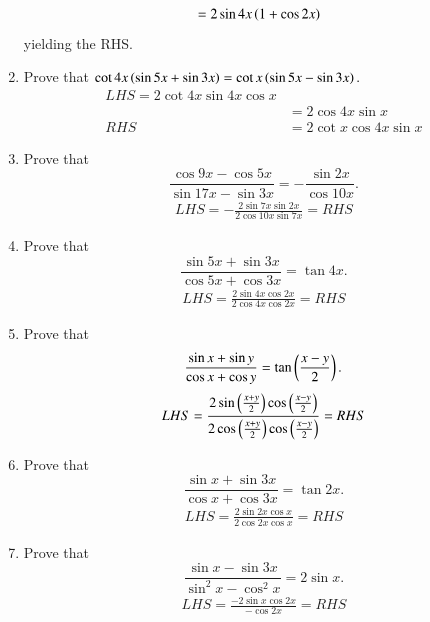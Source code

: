 \begin{enumerate}[label=\thesubsection.\arabic*,ref=\thesubsection.\theenumi,itemsep=1ex]
\begin{align}
	&=2\sin4x\left(1+\cos 2x\right) 
\end{align}
yielding the RHS.
\item Prove that
$\cot4x\left(\sin5x+\sin3x\right)= \cot x\left(\sin5x-\sin3x\right).$
%
\\
\solution  
\begin{align}
	LHS = 
2\cot4x\sin4x\cos x
\\
	&= 
2\cos4x\sin x
	\\
	RHS&=2\cot x\cos 4x \sin x
\end{align}
\item Prove that
$$\frac{\cos9x-\cos5x}{\sin17x-\sin3x}=-\frac{\sin2x}{\cos10x}.$$
%
\solution
\begin{align}
LHS = -\frac{2 \sin7x\sin 2x}{2\cos 10x\sin7x}
=RHS
\end{align}
\item Prove that
$$\frac{\sin5x+\sin3x}{\cos5x+\cos3x}=\tan4x.$$
%
\solution
\begin{align}
LHS = \frac{2\sin4x\cos 2x}{2\cos4x\cos2x}=RHS
\end{align}
\item Prove that
$$\frac{\sin x+\sin y}{\cos x+\cos y}=\tan\left(\frac{x-y}{2}\right).$$
%
\solution 
\begin{align}
LHS = \frac{2\sin \left(\frac{x+y}{2}\right)\cos\left(\frac{x-y}{2}\right)}{2\cos\left(\frac{x+y}{2}\right)\cos\left(\frac{x-y}{2}\right)}=RHS
\end{align}
\item Prove that
$$\frac{\sin x+\sin3x}{\cos x+\cos3x}=\tan2x.$$
%
\solution 
\begin{align}
	LHS=
\frac{2\sin 2x \cos x}{2\cos 2x\cos x}=RHS
\end{align}
\item Prove that
$$\frac{\sin x-\sin3x}{\sin^{2}x-\cos^{2}x}=2\sin x.$$
%
\solution
\begin{align}
LHS = \frac{-2\sin x\cos2x}{-\cos{2}x}=RHS
\end{align}


\end{enumerate}
